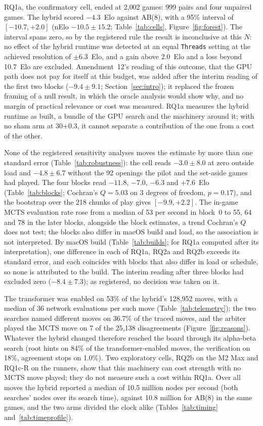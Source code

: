 \documentclass{article}
\begin{document}
RQ1a, the confirmatory cell, ended at 2{,}002 games: 999 pairs and four unpaired games. The hybrid scored $-4.3$~Elo against AB(8), with a 95\% interval of $[-10.7, +2.0]$ (nElo $-10.5 \pm 15.2$; Table~\ref{tab:cells}, Figure~\ref{fig:forest}). The interval spans zero, so by the registered rule the result is inconclusive at this $N$: no effect of the hybrid runtime was detected at an equal \texttt{Threads} setting at the achieved resolution of $\pm 6.3$~Elo, and a gain above 2.0~Elo and a loss beyond 10.7~Elo are excluded. Amendment~12's reading of this outcome, that the GPU path does not pay for itself at this budget, was added after the interim reading of the first two blocks ($-9.4 \pm 9.1$; Section~\ref{sec:intro}); it replaced the frozen framing of a null result, in which the oracle analysis would show why, and no margin of practical relevance or cost was measured. RQ1a measures the hybrid runtime as built, a bundle of the GPU search and the machinery around it; with no sham arm at 30+0.3, it cannot separate a contribution of the one from a cost of the other.

None of the registered sensitivity analyses moves the estimate by more than one standard error (Table~\ref{tab:robustness}): the cell reads $-3.0 \pm 8.0$ at zero outside load and $-4.8 \pm 6.7$ without the 92 openings the pilot and the set-aside games had played. The four blocks read $-11.8$, $-7.0$, $-6.3$ and $+7.6$~Elo (Table~\ref{tab:blocks}; Cochran's $Q = 5.03$ on 3 degrees of freedom, $p = 0.17$), and the bootstrap over the 218 chunks of play gives $[-9.9, +2.2]$. The in-game MCTS evaluation rate rose from a median of 53 per second in block~0 to 55, 64 and 78 in the later blocks, alongside the block estimates, a trend Cochran's $Q$ does not test; the blocks also differ in macOS build and load, so the association is not interpreted. By macOS build (Table~\ref{tab:builds}; for RQ1a computed after its interpretation), one difference in each of RQ1a, RQ2a and RQ2b exceeds its standard error, and each coincides with blocks that also differ in load or schedule, so none is attributed to the build. The interim reading after three blocks had excluded zero ($-8.4 \pm 7.3$); as registered, no decision was taken on it.

The transformer was enabled on 53\% of the hybrid's 128{,}952 moves, with a median of 36 network evaluations per such move (Table~\ref{tab:telemetry}); the two searches named different moves on 36.7\% of the traced moves, and the arbiter played the MCTS move on 7 of the 25{,}138 disagreements (Figure~\ref{fig:reasons}). Whatever the hybrid changed therefore reached the board through its alpha-beta search (root hints on 84\% of the transformer-enabled moves, the verification on 18\%, agreement stops on 1.0\%). Two exploratory cells, RQ2b on the M2 Max and RQ1c-R on the runners, show that this machinery can cost strength with no MCTS move played; they do not measure such a cost within RQ1a. Over all moves the hybrid reported a median of 10.5 million
nodes per second (both searches' nodes over its search time), against 10.8 million for AB(8) in the same
games, and the two arms divided the clock alike (Tables~\ref{tab:timing} and~\ref{tab:timeprofile}).
\end{document}
